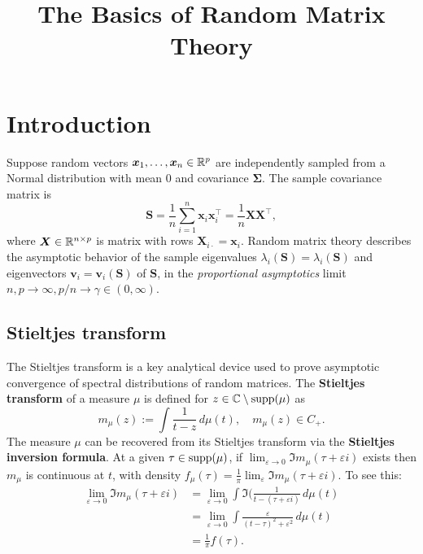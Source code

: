 \documentclass{article}
\title{ {\bf The Basics of Random Matrix Theory} }
\newcommand{\bx}{\boldsymbol{x}}
\newcommand{\bv}{\boldsymbol{v}}
\newcommand{\bX}{\boldsymbol{X}}
\newcommand{\bSigma}{\boldsymbol{\Sigma}}
\newcommand{\bS}{\boldsymbol{S}}
\begin{document}
	
\maketitle
\RaggedRight


\section{Introduction}

Suppose random vectors $\bx_1,\ldots,\bx_n \in \Reals^p$ are independently sampled from a Normal distribution with mean $0$ and covariance $\bSigma$. The sample covariance matrix is
$$
\bS = \frac{1}{n}\sum_{i = 1}^{n} \bx_i \bx_i^{\top} = \frac{1}{n}\bX \bX^{\top},
$$ 
where $\bX \in \Reals^{n \times p}$ is matrix with rows $\bX_{i\cdot} = \bx_i$. Random matrix theory describes the asymptotic behavior of the sample eigenvalues $\lambda_i(\bS) = \lambda_i(\bS)$ and eigenvectors $\bv_i = \bv_i(\bS)$ of $\bS$, in the \emph{proportional asymptotics} limit $n,p \to \infty, p/n \to \gamma \in (0,\infty)$. 

\subsection{Stieltjes transform}
The Stieltjes transform is a key analytical device used to prove asymptotic convergence of spectral distributions of random matrices. The {\bf Stieltjes transform} of a measure $\mu$ is defined for $z \in \mathbb{C}\setminus\mathrm{supp}(\mu)$ as
$$
m_{\mu}(z) := \int \frac{1}{t - z} \,d\mu(t), \quad m_{\mu}(z) \in C_{+}.
$$
The measure $\mu$ can be recovered from its Stieltjes transform via the {\bf Stieltjes inversion formula}. At a given $\tau \in \mathrm{supp}(\mu)$, if $\lim_{\varepsilon \to 0} \Im m_{\mu}(\tau + \varepsilon i)$ exists then $m_{\mu}$ is continuous at $t$, with density $f_{\mu}(\tau) = \frac{1}{\pi}\lim_{\varepsilon} \Im m_{\mu}(\tau + \varepsilon i)$. To see this:
\begin{align*}
	\lim_{\varepsilon \to 0}\Im m_{\mu}(\tau + \varepsilon i) 
	& = 
	\lim_{\varepsilon \to 0}\int \Im(\frac{1}{t - (\tau + \varepsilon i)} \,d\mu(t) \\
	& = \lim_{\varepsilon \to 0} \int \frac{\varepsilon}{(t - \tau)^2 + \varepsilon^2} \,d\mu(t) \\
	& = \frac{1}{\pi}f(\tau).
\end{align*} 
\end{document}
